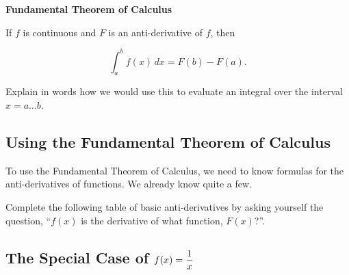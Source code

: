 {\bf Fundamental Theorem of Calculus}

If $f$ is continuous and $F$ is an anti-derivative of $f$, then 
\begin{boxnote}
\[ \int_a^b f(x)\,dx=F(b)-F(a).
\]
\end{boxnote}

 Explain in words how we would use this to evaluate an
  integral over the interval $x =a \ldots b$.

\vfill

\newpage

\subsection*{Using the Fundamental Theorem of Calculus}
To use the Fundamental Theorem of Calculus, we need to know formulas
for the anti-derivatives of functions.  We already know quite a few.

\newpage

\begin{problem} 
Complete the following table of basic anti-derivatives by
asking yourself the question, ``$f(x)$ is the derivative of what
function, $F(x)$?''.

\begin{center}
\end{center}
\end{problem}

\newpage
\subsection*{The Special Case of $\displaystyle f(x) = \frac{1}{x}$}

